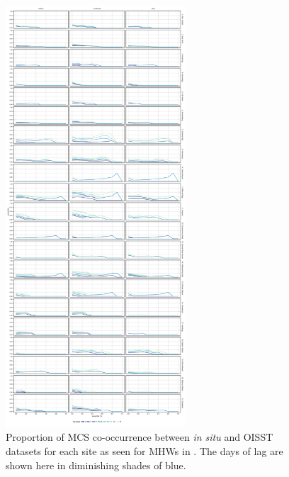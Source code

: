 \documentclass[a4paper,10pt,review]{elsarticle}
\begin{document}
\begin{figure}
\centering \includegraphics[width=0.6\textwidth]{figure5.pdf}
\caption{Proportion of MCS co-occurrence between \emph{in situ} and OISST datasets for each site as seen for MHWs in . The days of lag are shown here in diminishing shades of blue.} \label{fig:Figure5}
\end{figure}
\end{document}
